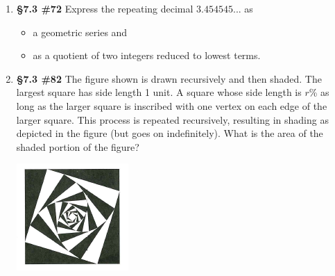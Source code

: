 \documentclass[%
]{article}
\begin{document}
\begin{enumerate}
\item {\bf \S7.3 \#72} Express the repeating decimal $3.454545...$ as
	\begin{itemize}
	\item a geometric series and
	\item as a quotient of two integers reduced to lowest terms.
	\end{itemize} 

\item {\bf \S7.3 \#82} The figure shown is drawn recursively and then shaded.  The largest square has side length 1 unit.  A square whose side length is $r$\% as long as the larger square is inscribed with one vertex on each edge of the larger square.  This process is repeated recursively, resulting in shading as depicted in the figure (but goes on indefinitely).  What is the area of the shaded portion of the figure?
\begin{center}
\includegraphics[scale=1.25]{7-3_82TaalmanKohn}
\end{center}

	

	
\end{enumerate}
\end{document}
